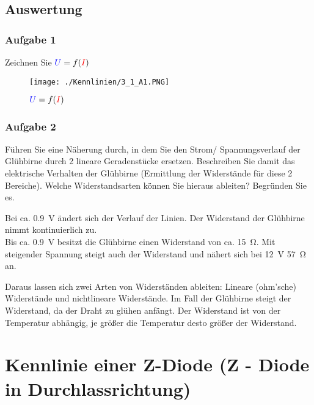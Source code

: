 \documentclass[a4paper,titlepage,parskip]{scrreprt}
\newcommand{\spannung}[1]{\textcolor{blue}{#1}}
\newcommand{\strom}[1]{\textcolor{red}{#1}}
\begin{document}
         \subsection{Auswertung}
           \subsubsection{Aufgabe 1} Zeichnen Sie $\spannung{U} = f (\strom{I})$

             \begin{figure}[!htbp]
                 \begin{center}
                     \texttt{[image: ./Kennlinien/3\_1\_A1.PNG]}

                     \caption{$\spannung{U} = f(\strom{I})$}

                    \end{center}
                \end{figure}


           \subsubsection{Aufgabe 2} Führen Sie eine Näherung durch, in dem Sie den Strom/ Spannungsverlauf der Glühbirne durch 2 lineare Geradenstücke ersetzen. Beschreiben Sie damit das elektrische Verhalten der Glühbirne (Ermittlung der Widerstände für diese 2 Bereiche). Welche Widerstandsarten können Sie hieraus ableiten? Begründen Sie es.
          
            
           Bei ca. \SI{0,9}{\volt}  ändert sich der Verlauf der Linien. Der Widerstand der Glühbirne nimmt kontinuierlich zu.\\
           Bis ca. \SI{0,9}{\volt} besitzt die Glühbirne einen Widerstand von ca. \SI{15}{\ohm}. Mit steigender Spannung steigt auch der Widerstand und nähert sich bei \SI{12}{\volt} \SI{57}{\ohm} an.
           
           Daraus lassen sich zwei Arten von Widerständen ableiten: Lineare (ohm'sche) Widerstände und nichtlineare Widerstände. Im Fall der Glühbirne steigt der Widerstand, da der Draht zu glühen anfängt. Der Widerstand ist von der Temperatur abhängig, je größer die Temperatur desto größer der Widerstand.


        \section{Kennlinie einer Z-Diode (Z - Diode in Durchlassrichtung)}
\end{document}
